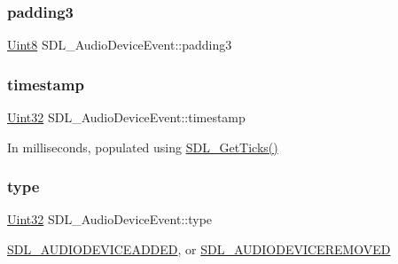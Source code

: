 \subsubsection{\texorpdfstring{padding3}{padding3}}
{\footnotesize\ttfamily \mbox{\hyperlink{_s_d_l__stdinc_8h_a2944638813a090aa23e62f4da842c3e2}{Uint8}} S\+D\+L\+\_\+\+Audio\+Device\+Event\+::padding3}

\mbox{\label{struct_s_d_l___audio_device_event_aa471680486a6103eafc9af569016df57}} 
\subsubsection{\texorpdfstring{timestamp}{timestamp}}
{\footnotesize\ttfamily \mbox{\hyperlink{_s_d_l__stdinc_8h_add440eff171ea5f55cb00c4a9ab8672d}{Uint32}} S\+D\+L\+\_\+\+Audio\+Device\+Event\+::timestamp}

In milliseconds, populated using \mbox{\hyperlink{_s_d_l__timer_8h_a0b9bc71d6287e0ffafdc3419760fe2b3}{S\+D\+L\+\_\+\+Get\+Ticks()}} \mbox{\label{struct_s_d_l___audio_device_event_ae68c3bd49b49608711a17395c7cbfe58}} 
\subsubsection{\texorpdfstring{type}{type}}
{\footnotesize\ttfamily \mbox{\hyperlink{_s_d_l__stdinc_8h_add440eff171ea5f55cb00c4a9ab8672d}{Uint32}} S\+D\+L\+\_\+\+Audio\+Device\+Event\+::type}

\mbox{\hyperlink{_s_d_l__events_8h_a3b589e89be6b35c02e0dd34a55f3fccaadb3154654baf003910e75d74b507a82b}{S\+D\+L\+\_\+\+A\+U\+D\+I\+O\+D\+E\+V\+I\+C\+E\+A\+D\+D\+ED}}, or \mbox{\hyperlink{_s_d_l__events_8h_a3b589e89be6b35c02e0dd34a55f3fccaad56f8934fe24ee4c0cd9329e3c57c0c2}{S\+D\+L\+\_\+\+A\+U\+D\+I\+O\+D\+E\+V\+I\+C\+E\+R\+E\+M\+O\+V\+ED}} \mbox{\label{struct_s_d_l___audio_device_event_ac91d70fd4e1dd596185fed061388896c}} 
